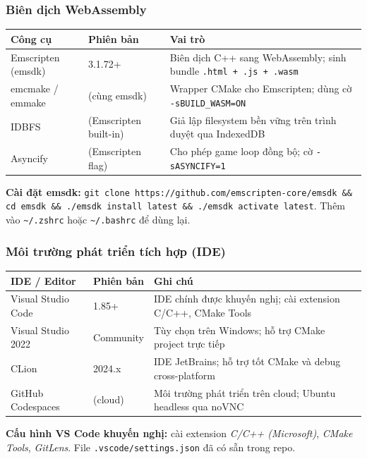 \documentclass[12pt,a4paper]{article}
\begin{document}
\subsubsection{Biên dịch WebAssembly}

\begin{tabularx}{\linewidth}{|l|l|X|}
\hline
\rowcolor{gray!20}
\textbf{Công cụ} & \textbf{Phiên bản} & \textbf{Vai trò} \\
\hline
Emscripten (emsdk) & 3.1.72+ & Biên dịch C++ sang WebAssembly; sinh bundle \texttt{.html + .js + .wasm} \\
\hline
emcmake / emmake & (cùng emsdk) & Wrapper CMake cho Emscripten; dùng cờ \texttt{-sBUILD\_WASM=ON} \\
\hline
IDBFS & (Emscripten built-in) & Giả lập filesystem bền vững trên trình duyệt qua IndexedDB \\
\hline
Asyncify & (Emscripten flag) & Cho phép game loop đồng bộ; cờ \texttt{-sASYNCIFY=1} \\
\hline
\end{tabularx}

\vspace{4pt}
\noindent\textbf{Cài đặt emsdk:} \texttt{git clone https://github.com/emscripten-core/emsdk \&\&
cd emsdk \&\& ./emsdk install latest \&\& ./emsdk activate latest}.
Thêm vào \texttt{\textasciitilde/.zshrc} hoặc \texttt{\textasciitilde/.bashrc} để dùng lại.

\subsubsection{Môi trường phát triển tích hợp (IDE)}

\begin{tabularx}{\linewidth}{|l|l|X|}
\hline
\rowcolor{gray!20}
\textbf{IDE / Editor} & \textbf{Phiên bản} & \textbf{Ghi chú} \\
\hline
Visual Studio Code & 1.85+ & IDE chính được khuyến nghị; cài extension C/C++, CMake Tools \\
\hline
Visual Studio 2022 & Community & Tùy chọn trên Windows; hỗ trợ CMake project trực tiếp \\
\hline
CLion & 2024.x & IDE JetBrains; hỗ trợ tốt CMake và debug cross-platform \\
\hline
GitHub Codespaces & (cloud) & Môi trường phát triển trên cloud; Ubuntu headless qua noVNC \\
\hline
\end{tabularx}

\vspace{4pt}
\noindent\textbf{Cấu hình VS Code khuyến nghị:} cài extension \textit{C/C++ (Microsoft)},
\textit{CMake Tools}, \textit{GitLens}. File \texttt{.vscode/settings.json} đã có sẵn trong repo.
\end{document}
